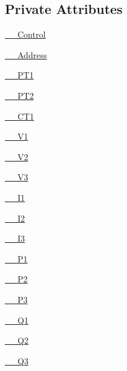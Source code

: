 \subsection*{Private Attributes}
\begin{DoxyCompactItemize}
\item 
\hyperlink{class_m_i_c3_1_1_m_i_c1_a925ca2e301860fe9aa378350534b161f}{\+\_\+\+\_\+\+Control}
\item 
\hyperlink{class_m_i_c3_1_1_m_i_c1_a41c7912044a1237fba1a97e5c3ce7af1}{\+\_\+\+\_\+\+Address}
\item 
\hyperlink{class_m_i_c3_1_1_m_i_c1_a0202879a9a20c6db9fab96bf2bc2665a}{\+\_\+\+\_\+\+P\+T1}
\item 
\hyperlink{class_m_i_c3_1_1_m_i_c1_a27404fde06ca91ba97fed1afe1305a4c}{\+\_\+\+\_\+\+P\+T2}
\item 
\hyperlink{class_m_i_c3_1_1_m_i_c1_aaa1e6791e5fb9881e4c0bb7fdba94a1f}{\+\_\+\+\_\+\+C\+T1}
\item 
\hyperlink{class_m_i_c3_1_1_m_i_c1_a808ae0455f68a6e35d5cf646f2ed5bed}{\+\_\+\+\_\+\+V1}
\item 
\hyperlink{class_m_i_c3_1_1_m_i_c1_aa931212b1077630e0d00a7521b9ba7ef}{\+\_\+\+\_\+\+V2}
\item 
\hyperlink{class_m_i_c3_1_1_m_i_c1_ac14c988b04364214b6846226e31d7416}{\+\_\+\+\_\+\+V3}
\item 
\hyperlink{class_m_i_c3_1_1_m_i_c1_aa9c7409f828f138464d9a3993b5f963e}{\+\_\+\+\_\+\+I1}
\item 
\hyperlink{class_m_i_c3_1_1_m_i_c1_a17b42cbaf99e99320ef96d929239cf44}{\+\_\+\+\_\+\+I2}
\item 
\hyperlink{class_m_i_c3_1_1_m_i_c1_ada54499b12ef8714e2e359d69a5a9a37}{\+\_\+\+\_\+\+I3}
\item 
\hyperlink{class_m_i_c3_1_1_m_i_c1_ad9d7c288a2f535a91f01fdb7f688f9cc}{\+\_\+\+\_\+\+P1}
\item 
\hyperlink{class_m_i_c3_1_1_m_i_c1_ac4bbfbf696790ea59be3e8153089107e}{\+\_\+\+\_\+\+P2}
\item 
\hyperlink{class_m_i_c3_1_1_m_i_c1_a584aaa23ae37f473e718ac005c95be6e}{\+\_\+\+\_\+\+P3}
\item 
\hyperlink{class_m_i_c3_1_1_m_i_c1_accfdf53475991f816e00e89be6011df5}{\+\_\+\+\_\+\+Q1}
\item 
\hyperlink{class_m_i_c3_1_1_m_i_c1_aa52fd24601379190142365d2e94ed3bc}{\+\_\+\+\_\+\+Q2}
\item 
\hyperlink{class_m_i_c3_1_1_m_i_c1_afcffecd5fd8a2b410326e3d5ba79c78e}{\+\_\+\+\_\+\+Q3}
\item 

\end{DoxyCompactItemize}

